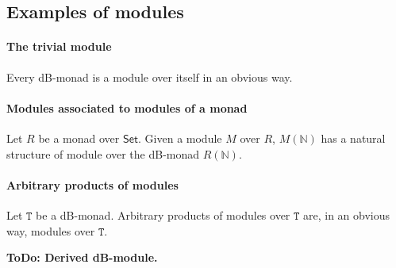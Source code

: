 \documentclass[a4paper,twoside,12pt]{article}
\theoremstyle{definition}
\theoremstyle{remark}
\newcommand{\NN}{\mathbb{N}}
\newcommand{\TT}{\mathtt{T}}
\begin{document}
\subsection{Examples of modules}
\label{sec:examples-modules}

\paragraph{The trivial module}

Every dB-monad is a module over itself in an obvious way.

\paragraph{Modules associated to modules of a monad}

Let $R$ be a monad over $\mathsf{Set}$.  Given a module $M$ over $R$,
$M(\NN)$ has a natural structure of module over the dB-monad $R(\NN)$.

\paragraph{Arbitrary products of modules}

Let $\TT$ be a dB-monad.  Arbitrary products of modules over $\TT$
are, in an obvious way, modules over $\TT$.

\textbf{ToDo: Derived dB-module.}
\end{document}
